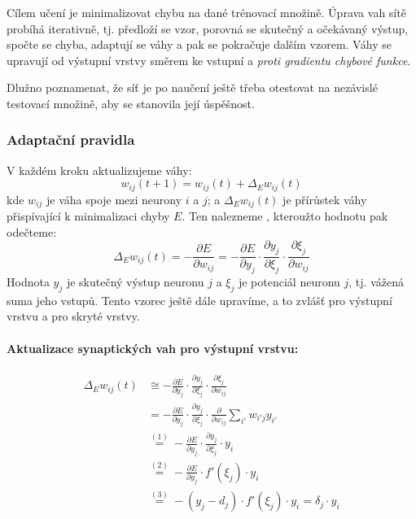 \documentclass[11pt]{report} %
\begin{document}
Cílem učení je minimalizovat chybu na dané trénovací množině. Úprava vah sítě probíhá iterativně, tj. předloží se vzor, porovná se skutečný a očekávaný výstup, spočte se chyba, adaptují se váhy a pak se pokračuje dalším vzorem. Váhy se upravují od výstupní vrstvy směrem ke vstupní a \textit{proti gradientu chybové funkce}.

Dlužno poznamenat, že síť je po naučení ještě třeba otestovat na nezávislé testovací množině, aby se stanovila její úspěšnost.

\subsubsection{Adaptační pravidla}
V každém kroku aktualizujeme váhy:
$$
w_{ij}(t+1) = w_{ij}(t) + \Delta_E w_{ij}(t)
$$
kde $w_{ij}$ je váha spoje mezi neurony $i$ a $j$; a $\Delta_E w_{ij}(t)$ je přírůstek váhy přispívající k minimalizaci chyby $E$. Ten nalezneme , kteroužto hodnotu pak odečteme:
$$
\Delta_E w_{ij}(t) 
= -\frac{\partial E}{\partial w_{ij}} 
= -\frac{\partial E}{\partial y_j} \cdot \frac{\partial y_j}{\partial \xi_j} \cdot \frac{\partial \xi_j}{\partial w_{ij}}
$$
Hodnota $y_j$ je skutečný výstup neuronu $j$ a $\xi_j$ je potenciál neuronu $j$, tj. vážená suma jeho vstupů. Tento vzorec ještě dále upravíme, a to zvlášť pro výstupní vrstvu a pro skryté vrstvy. 

\paragraph{Aktualizace synaptických vah pro výstupní vrstvu:}
\begin{align*}
\Delta_E w_{ij}(t) 
&\cong -\frac{\partial E}{\partial y_j} \cdot \frac{\partial y_j}{\partial \xi_j} \cdot \frac{\partial \xi_j}{\partial w_{ij}}\\
&= -\frac{\partial E}{\partial y_j} \cdot \frac{\partial y_j}{\partial \xi_j} \cdot \frac{\partial}{\partial w_{ij}}\sum\limits_{i'} w_{i'j}y_{i'}\\
&\stackrel{(1)}{=} -\frac{\partial E}{\partial y_j} \cdot \frac{\partial y_j}{\partial \xi_j} \cdot y_{i}\\
&\stackrel{(2)}{=} -\frac{\partial E}{\partial y_j} \cdot f'(\xi_j) \cdot y_{i}\\
&\stackrel{(3)}{=} -(y_j - d_j) \cdot f'(\xi_j) \cdot y_{i} = \delta_j \cdot y_{i}\\
\end{align*}
\end{document}
